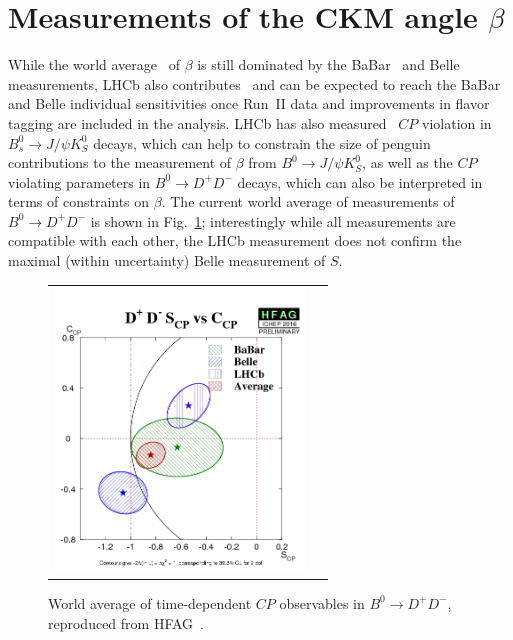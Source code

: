 \section{Measurements of the CKM angle $\beta$}
\label{sec:beta}

While the world average~\cite{HFAG} of $\beta$ is still dominated
by the BaBar~\cite{Aubert:2009aw} and Belle~\cite{Adachi:2012et} measurements, LHCb also contributes~\cite{LHCb-PAPER-2012-035} and can be expected
to reach the BaBar and Belle individual sensitivities once Run~II data and
improvements in flavor tagging are included in the analysis. LHCb has also measured~\cite{LHCb-PAPER-2015-005}
$CP$ violation in $B^0_s \to J/\psi K^0_S$ decays,
which can help to constrain the size of penguin contributions to the measurement
of $\beta$ from $B^0 \to J/\psi K^0_S$, as well as the $CP$ violating parameters in
$B^0 \to D^+ D^-$ decays, which can also be interpreted in terms of constraints on $\beta$.
The current world average of measurements of $B^0 \to D^+ D^-$ is shown in Fig.~\ref{b2ddwa}; 
interestingly while all measurements are compatible with each other, the LHCb measurement
does not confirm the maximal (within uncertainty) Belle measurement of $S$.

\begin{figure}
  \begin{center}
    \begin{tabular}{c c}
      \includegraphics[height=7.5cm]{figs/D+D-S_CPvsC_CP.png} &
    \end{tabular}
  \end{center}
  \vspace{-0.5cm}
  \caption{\label{b2ddwa}World average of time-dependent $CP$ observables in $B^0 \to D^+ D^-$, reproduced from HFAG~\cite{HFAG}.}
\end{figure}

